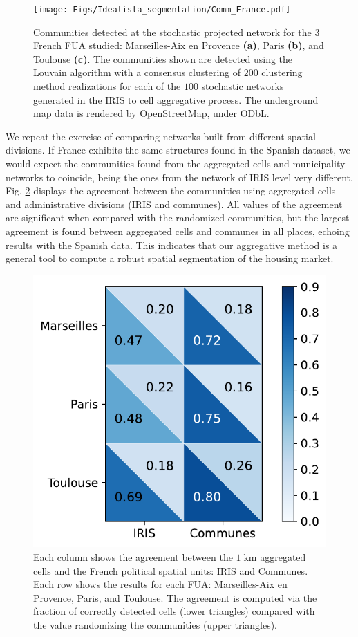 \begin{figure}
    \label{fig:france_comm}
    \centering
    \texttt{[image: Figs/Idealista\_segmentation/Comm\_France.pdf]}
	\caption[Spatial segmentation for $1 \; \textrm{km}$ aggregated cells constructed from IRIS level data for France.]{ Communities detected at the stochastic projected network for the 3 French FUA studied: Marseilles-Aix en Provence \textbf{(a)}, Paris \textbf{(b)}, and Toulouse \textbf{(c)}. The communities shown are detected using the Louvain algorithm with a consensus clustering of $200$ clustering method realizations for each of the $100$ stochastic networks generated in the IRIS to cell aggregative process. The underground map data is rendered by OpenStreetMap, under ODbL.}
\end{figure}

We repeat the exercise of comparing networks built from different spatial divisions. If France exhibits the same structures found in the Spanish dataset, we would expect the communities found from the aggregated cells and municipality networks to coincide, being the ones from the network of IRIS level very different. Fig. \ref{fig:Compare_france} displays the agreement between the communities using aggregated cells and administrative divisions (IRIS and communes). All values of the agreement are significant when compared with the randomized communities, but the largest agreement is found between aggregated cells and communes in all places, echoing results with the Spanish data. This indicates that our aggregative method is a general tool to compute a robust spatial segmentation of the housing market.

\begin{figure}
    \label{fig:Compare_france}
    \centering
    \includegraphics[width = 0.6
    \textwidth]{Figs/Idealista_segmentation/Cells_agreement_different_topologies_France.pdf}
	\caption[Comparison between the $1 \; \textrm{km}$ aggregated cells communities and the political units communities in France.]{ Each column shows the agreement between the $1 \; \textrm{km}$ aggregated cells and the French political spatial units: IRIS and Communes. Each row shows the results for each FUA: Marseilles-Aix en Provence, Paris, and Toulouse. The agreement is computed via the fraction of correctly detected cells (lower triangles) compared with the value randomizing the communities (upper triangles).}
\end{figure}


